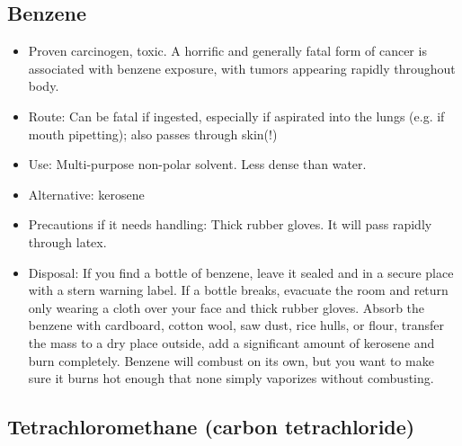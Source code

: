 \subsection{Benzene}

\begin{itemize}

\item{Proven carcinogen, toxic. 
A horrific and generally fatal form of cancer 
is associated with benzene exposure, 
with tumors appearing rapidly throughout body.}

\item{Route: Can be fatal if ingested, 
especially if aspirated into the lungs 
(e.g. if mouth pipetting); also passes through skin(!)}

\item{Use: Multi-purpose non-polar solvent. 
Less dense than water.}

\item{Alternative: kerosene}

\item{Precautions if it needs handling: Thick rubber gloves. 
It will pass rapidly through latex.}

\item{Disposal: If you find a bottle of benzene, 
leave it sealed and in a secure place with a stern warning label. 
If a bottle breaks, 
evacuate the room and return only wearing a cloth over your face 
and thick rubber gloves. 
Absorb the benzene with cardboard, cotton wool, 
saw dust, rice hulls, or flour, 
transfer the mass to a dry place outside, 
add a significant amount of kerosene and burn completely. 
Benzene will combust on its own, 
but you want to make sure it burns hot enough 
that none simply vaporizes without combusting.}

\end{itemize}

\subsection{Tetrachloromethane (carbon tetrachloride)}

